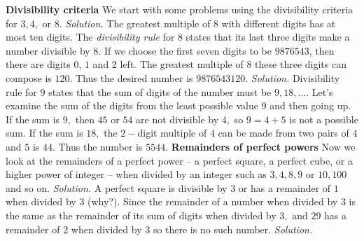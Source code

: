 \begin{multicols}{2}
	\vskip 0.1cm
	\textbf{\color{toancuabi}Divisibility criteria}
	\vskip 0.1cm
	We start with some problems using the divisibility criteria for $3, 4,$ or $8$.
	\vskip 0.1cm
	\vskip 0.1cm
	\textit{Solution.} The greatest multiple of $8$ with different digits has at most ten digits. The {\em divisibility rule} for $8$ states that its last three digits make a number divisible by $8$. If we choose the first seven digits to be $9876543$, then there are digits $0$, $1$ and $2$ left. The greatest multiple of $8$ these three digits can compose is $120$. Thus the desired number is $9876543120$.
	\vskip 0.15cm
	\vskip 0.1cm
	\textit{Solution.} Divisibility rule for $9$ states that the sum of digits of the number must be $9, 18, \ldots.$
	Let's examine  the sum of the digits from the least possible value $9$ and then going up.
	If the sum is $9,$ then $45$ or $54$ are not divisible by $4,$ so $9=4+5$ is not a possible sum.
	If the sum is $18,$ the $2-$digit multiple of $4$ can be made from two pairs of $4$ and $5$ is $44.$
	Thus the number is ${5544}.$
	\vskip 0.15cm
	\vskip 0.1cm
	\textbf{\color{toancuabi}Remainders of  perfect powers}
	\vskip 0.1cm
	Now we look at the remainders of a perfect power -- a perfect square, a perfect cube, or a higher power of integer
	-- when divided by an integer such as $3, 4, 8,9$ or $10,100$ and so on.
	\vskip 0.1cm
	\vskip 0.1cm
	\textit{Solution.}
	A perfect square is divisible by $3$ or has a remainder of $1$ when divided by $3$ (why?).
	Since the remainder of a number when divided by $3$ is the same as the remainder of its sum of digits when divided by $3,$
	and $29$ has a remainder of $2$ when divided by $3$ so there is no such number.
	\vskip 0.1cm
	\vskip 0.1cm
	\textit{Solution.}

\end{multicols}
